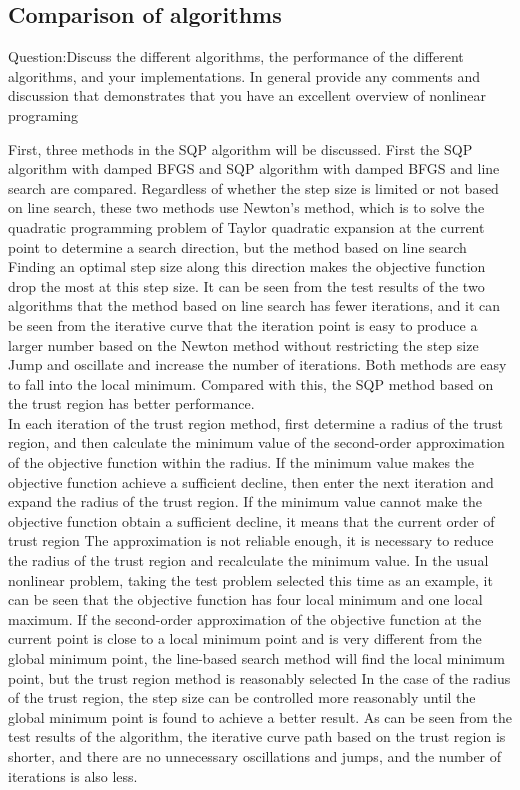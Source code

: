 \subsection{\bfseries Comparison of algorithms}
\begin{shaded}
{Question:Discuss the different algorithms, the performance of the different algorithms, and
your implementations. In general provide any comments and discussion that
demonstrates that you have an excellent overview of nonlinear programing}
\end{shaded}
First, three methods in the SQP algorithm will be discussed. First the SQP algorithm with damped BFGS and SQP algorithm with damped BFGS and line search are compared. Regardless of whether the step size is limited or not based on line search, these two methods use Newton's method, which is to solve the quadratic programming problem of Taylor quadratic expansion at the current point to determine a search direction, but the method based on line search Finding an optimal step size along this direction makes the objective function drop the most at this step size. It can be seen from the test results of the two algorithms that the method based on line search has fewer iterations, and it can be seen from the iterative curve that the iteration point is easy to produce a larger number based on the Newton method without restricting the step size Jump and oscillate and increase the number of iterations.  Both methods are easy to fall into the local minimum. Compared with this, the SQP method based on the trust region has better performance.\\

In each iteration of the trust region method, first determine a radius of the trust region, and then calculate the minimum value of the second-order approximation of the objective function within the radius. If the minimum value makes the objective function achieve a sufficient decline, then enter the next iteration and expand the radius of the trust region. If the minimum value cannot make the objective function obtain a sufficient decline, it means that the current order of trust region The approximation is not reliable enough, it is necessary to reduce the radius of the trust region and recalculate the minimum value. In the usual nonlinear problem, taking the test problem selected this time as an example, it can be seen that the objective function has four local minimum and one local maximum. If the second-order approximation of the objective function at the current point is close to a local minimum point and is very different from the global minimum point, the line-based search method will find the local minimum point, but the trust region method is reasonably selected In the case of the radius of the trust region, the step size can be controlled more reasonably until the global minimum point is found to achieve a better result. As can be seen from the test results of the algorithm, the iterative curve path based on the trust region is shorter, and there are no unnecessary oscillations and jumps, and the number of iterations is also less. \\


